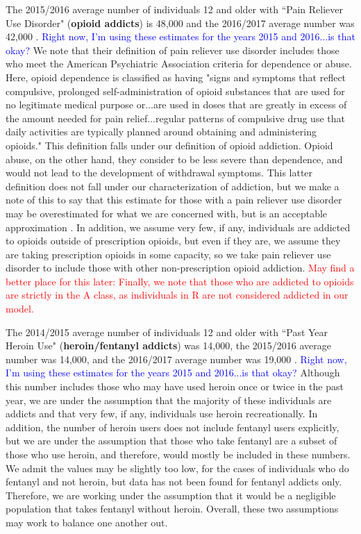 \documentclass[12pt]{article}
\begin{document}
The 2015/2016 average number of individuals 12 and older with ``Pain Reliever Use Disorder" (\textbf{opioid addicts}) is 48,000 and the 2016/2017 average number was 42,000 \cite{NSDUH2, NSDUH3}. \textcolor{blue}{Right now, I'm using these estimates for the years 2015 and 2016...is that okay?} 
We note that their definition of pain reliever use disorder includes those who meet the American Psychiatric Association criteria for dependence or abuse. Here, opioid dependence is classified as having "signs and symptoms that reflect compulsive, prolonged self-administration of opioid substances that are used for no legitimate medical purpose or...are used in doses that are greatly in excess of the amount needed for pain relief...regular patterns of compulsive drug use that daily activities are typically planned around obtaining and administering opioids." This definition falls under our definition of opioid addiction. Opioid abuse, on the other hand, they consider to be less severe than dependence, and would not lead to the development of withdrawal symptoms. This latter definition does not fall under our characterization of addiction, but we make a note of this to say that this estimate for those with a pain reliever use disorder may be overestimated for what we are concerned with, but is an acceptable approximation \cite{DSM}. In addition, we assume very few, if any, individuals are addicted to opioids outside of prescription opioids, but even if they are, we assume they are taking prescription opioids in some capacity, so we take pain reliever use disorder to include those with other non-prescription opioid addiction. \textcolor{red}{May find a better place for this later: Finally, we note that those who are addicted to opioids are strictly in the A class, as individuals in R are not considered addicted in our model.} 

The 2014/2015 average number of individuals 12 and older with ``Past Year Heroin Use" (\textbf{heroin/fentanyl addicts}) was 14,000, the 2015/2016 average number was 14,000, and the 2016/2017 average number was 19,000 \cite{NSDUH0, NSDUH2, NSDUH3}. \textcolor{blue}{Right now, I'm using these estimates for the years 2015 and 2016...is that okay?}  Although this number includes those who may have used heroin once or twice in the past year, we are under the assumption that the majority of these individuals are addicts and that very few, if any, individuals use heroin recreationally. In addition, the number of heroin users does not include fentanyl users explicitly, but we are under the assumption that those who take fentanyl are a subset of those who use heroin, and therefore, would mostly be included in these numbers. We admit the values may be slightly too low, for the cases of individuals who do fentanyl and not heroin, but data has not been found for fentanyl addicts only. Therefore, we are working under the assumption that it would be a negligible population that takes fentanyl without heroin. Overall, these two assumptions may work to balance one another out. 
\end{document}

